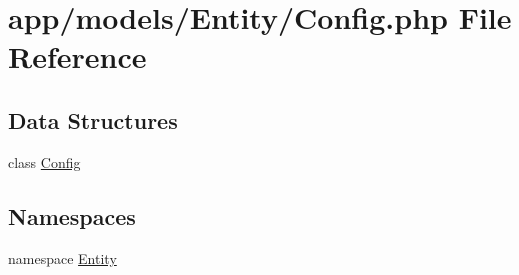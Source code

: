 \hypertarget{models_2_entity_2_config_8php}{\section{app/models/\-Entity/\-Config.php File Reference}
\label{models_2_entity_2_config_8php}
}
\subsection*{Data Structures}
\begin{DoxyCompactItemize}
\item 
class \hyperlink{class_entity_1_1_config}{Config}
\end{DoxyCompactItemize}
\subsection*{Namespaces}
\begin{DoxyCompactItemize}
\item 
namespace \hyperlink{namespace_entity}{Entity}
\end{DoxyCompactItemize}
